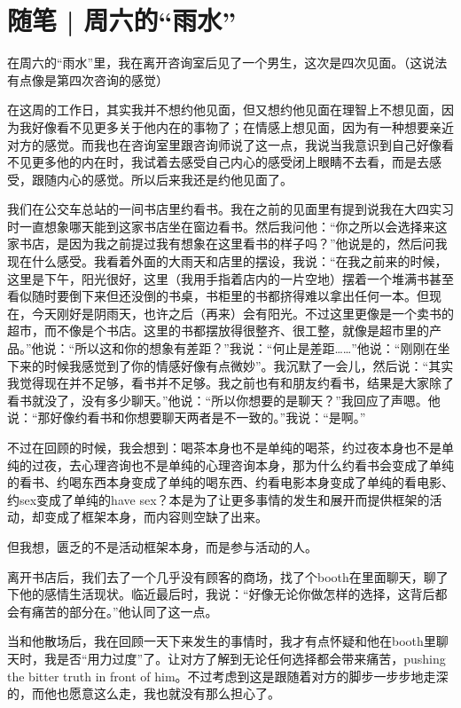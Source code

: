 \chapter{随笔 | 周六的“雨水”}


在周六的“雨水”里，我在离开咨询室后见了一个男生，这次是四次见面。（这说法有点像是第四次咨询的感觉）

在这周的工作日，其实我并不想约他见面，但又想约他见面\pozhehao{}在理智上不想见面，因为我好像看不见更多关于他内在的事物了；在情感上想见面，因为有一种想要亲近对方的感觉。而我也在咨询室里跟咨询师说了这一点，我说当我意识到自己好像看不见更多他的内在时，我试着去感受自己内心的感受\pozhehao{}闭上眼睛不去看，而是去感受，跟随内心的感觉。所以后来我还是约他见面了。


我们在公交车总站的一间书店里约看书。我在之前的见面里有提到说我在大四实习时一直想象哪天能到这家书店坐在窗边看书。然后我问他：“你之所以会选择来这家书店，是因为我之前提过我有想象在这里看书的样子吗？”他说是的，然后问我现在什么感受。我看着外面的大雨天和店里的摆设，我说：“在我之前来的时候，这里是下午，阳光很好，这里（我用手指着店内的一片空地）摆着一个堆满书甚至看似随时要倒下来但还没倒的书桌，书柜里的书都挤得难以拿出任何一本。但现在，今天刚好是阴雨天，也许之后（再来）会有阳光。不过这里更像是一个卖书的超市，而不像是个书店。这里的书都摆放得很整齐、很工整，就像是超市里的产品。”他说：“所以这和你的想象有差距？”我说：“何止是差距……”他说：“刚刚在坐下来的时候我感觉到了你的情感好像有点微妙”。我沉默了一会儿，然后说：“其实我觉得现在并不足够，看书并不足够。我之前也有和朋友约看书，结果是大家除了看书就没了，没有多少聊天。”他说：“所以你想要的是聊天？”我回应了声嗯。他说：“那好像约看书和你想要聊天两者是不一致的。”我说：“是啊。”

不过在回顾的时候，我会想到：喝茶本身也不是单纯的喝茶，约过夜本身也不是单纯的过夜，去心理咨询也不是单纯的心理咨询本身，那为什么约看书会变成了单纯的看书、约喝东西本身变成了单纯的喝东西、约看电影本身变成了单纯的看电影、约sex变成了单纯的have sex？本是为了让更多事情的发生和展开而提供框架的活动，却变成了框架本身，而内容则空缺了出来。

但我想，匮乏的不是活动框架本身，而是参与活动的人。


离开书店后，我们去了一个几乎没有顾客的商场，找了个booth在里面聊天，聊了下他的感情生活现状。临近最后时，我说：“好像无论你做怎样的选择，这背后都会有痛苦的部分在。”他认同了这一点。

当和他散场后，我在回顾一天下来发生的事情时，我才有点怀疑和他在booth里聊天时，我是否“用力过度”了。让对方了解到无论任何选择都会带来痛苦，pushing the bitter truth in front of him。不过考虑到这是跟随着对方的脚步一步步地走深的，而他也愿意这么走，我也就没有那么担心了。


